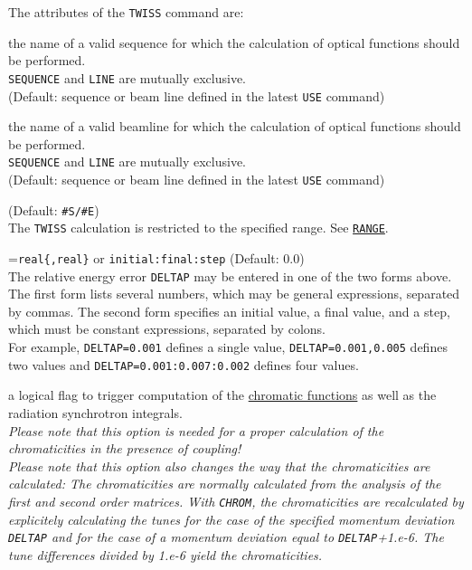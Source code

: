 The  attributes of the \texttt{TWISS} command are: 
\begin{madlist}
   the name of a valid sequence for
  which the calculation of optical functions should be performed. \\ 
  \texttt{SEQUENCE} and \texttt{LINE} are mutually exclusive.\\
  (Default: sequence or beam line defined in the latest \texttt{USE}
  command) 

   the name of a valid beamline for which
  the calculation of optical functions should be performed. \\
  \texttt{SEQUENCE} and \texttt{LINE} are mutually exclusive.\\
  (Default: sequence or beam line defined in the latest \texttt{USE}
  command) 
  
   (Default: \texttt{\#S/\#E})\\
  The \texttt{TWISS} calculation is restricted to the specified range.
  See \hyperref[sec:range]{\texttt{RANGE}}.  

  =\texttt{real\{,real\}} or \texttt{initial:final:step}
  (Default: 0.0)\\ 
  The relative energy error \texttt{DELTAP} may be entered in one of the
  two forms above. \\ 
  The first form lists several numbers, which may be general expressions,
  separated by commas. The second form specifies an initial value, a final
  value, and a step, which must be constant expressions, separated by
  colons. \\
  For example, \texttt{DELTAP=0.001} defines a single value, 
  \texttt{DELTAP=0.001,0.005} defines two values and 
  \texttt{DELTAP=0.001:0.007:0.002} defines four values. 


   a logical flag to trigger computation of the
  \hyperref[subsec:tables-chrom]{chromatic functions} as well as the radiation 
  synchrotron integrals. \\
  \textit{Please note that this option is needed for a proper
    calculation of the chromaticities in the presence of coupling!}\\
  \textit{Please note that this option also changes the way that the
    chromaticities are calculated: The chromaticities are normally
    calculated from the analysis of the first and second order
    matrices. With \texttt{CHROM}, the chromaticities are recalculated by
    explicitely calculating the tunes for the case of the specified momentum
    deviation \texttt{DELTAP} and for the case of a momentum deviation equal
    to \texttt{DELTAP}+1.e-6. The tune differences divided by 1.e-6 yield the
    chromaticities.}


\end{madlist}
